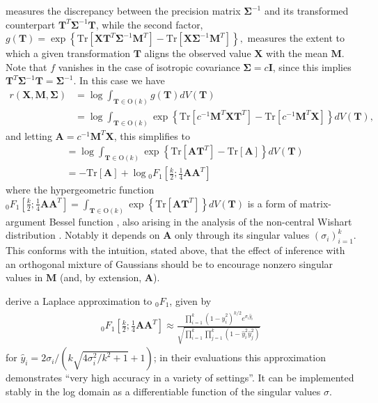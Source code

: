 \documentclass{article}
\newcommand{\Tr}{\text{Tr}}
\renewcommand{\O}{\text{O}}
\renewcommand{\v}[1]{\mathbf{#1}}
\newcommand{\I}{\v{I}}
\newcommand*\pFq[2]{{}_{#1}F_{#2}}%
\begin{document}
measures the discrepancy between the precision matrix $\v{\Sigma}^{-1}$ and its
transformed counterpart $\v{T}^T\v{\Sigma}^{-1}\v{T}$, while the second factor, $g(\v{T}) = \exp\left\{\Tr\left[\v{X}\v{T}^T\v{\Sigma}^{-1}\v{M}^T \right] -
  \Tr\left[\v{X}\v{\Sigma}^{-1}\v{M}^T\right]\right\},$ measures the extent to which a
given transformation $\v{T}$ aligns the observed value $\v{X}$ with the mean
$\v{M}$. Note that $f$ vanishes in the case of isotropic covariance $\v{\Sigma} = c\I$, since this implies
$\v{T}^T\v{\Sigma}^{-1}\v{T} = \v{\Sigma}^{-1}$. In this case we have
\begin{align*}
r(\v{X}, \v{M}, \v{\Sigma}) &= \log \int_{\v{T}\in \O(k)}  g(\v{T}) dV(\v{T})\\
&= \log \int_{\v{T}\in \O(k)}  \exp\left\{\Tr\left[c^{-1} \v{M}^T\v{X}\v{T}^T \right] -
  \Tr\left[c^{-1}\v{M}^T \v{X}\right]\right\} dV(\v{T}),
\end{align*}
and letting $\v{A} = c^{-1}\v{M}^T \v{X}$, this simplifies to
\begin{align*}
&= \log \int_{\v{T}\in \O(k)}  \exp\left\{\Tr\left[\v{A}\v{T}^T \right] - \Tr\left[\v{A}\right]\right\} dV(\v{T})\\
&= - \Tr\left[\v{A}\right] + \log \pFq{0}{1}\left[\frac{k}{2}; \frac{1}{4}\v{A}\v{A}^T\right]
\end{align*}
where the hypergeometric function $\pFq{0}{1}\left[\frac{k}{2}; \frac{1}{4}\v{A}\v{A}^T\right] = \int_{\v{T}\in \O(k)}  \exp\left\{\Tr\left[\v{A}\v{T}^T \right]\right\}
  dV(\v{T})$ is a form of matrix-argument Bessel function
  \citep{herz1955bessel}, also
  arising in the analysis of the non-central Wishart distribution
  \citep{muirhead1982aspects}. Notably it depends on $\v{A}$ only
  through its singular values $(\sigma_i)_{i=1}^k$. This conforms with
  the intuition, stated above, that the effect of inference with an orthogonal
  mixture of Gaussians should be to encourage nonzero singular values
  in $\v{M}$ (and, by extension, $\v{A}$). 

\citet{butler2003laplace} derive a Laplace approximation to $\pFq{0}{1}$,
given by
\begin{align}
\pFq{0}{1}\left[\frac{k}{2}; \frac{1}{4}\v{A}\v{A}^T\right] \approx
  \frac{\prod_{i=1}^k (1-\hat{y}_i^2)^{k/2}e^{\sigma_i\hat{y}_i}}
  {\sqrt{\prod_{i=1}^k\prod_{j=1}^k (1-\hat{y}_i^2 \hat{y}_j^2)}}\label{eqn:laplace}
\end{align}
for $\hat{y}_i = 2\sigma_i/(k \sqrt{4\sigma_i^2 / k^2 + 1} +
1)$; in their evaluations this approximation demonstrates ``very high
accuracy in a variety of settings''. It can be implemented stably in the log domain as a differentiable
function of the singular values $\sigma$. 
\end{document}
